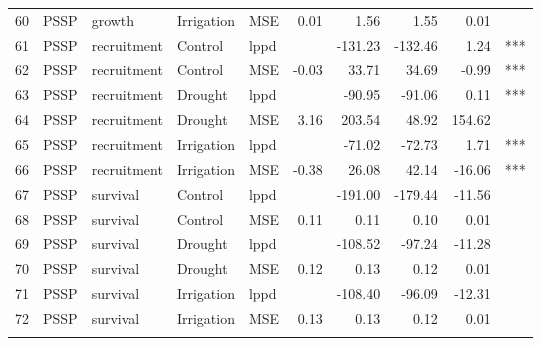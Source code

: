 \begin{longtable}{rllllrrrrl}
  60 & PSSP & growth & Irrigation & MSE & 0.01 & 1.56 & 1.55 & 0.01 &  \\ 
  61 & PSSP & recruitment & Control & lppd &  & -131.23 & -132.46 & 1.24 & *** \\ 
  62 & PSSP & recruitment & Control & MSE & -0.03 & 33.71 & 34.69 & -0.99 & *** \\ 
  63 & PSSP & recruitment & Drought & lppd &  & -90.95 & -91.06 & 0.11 & *** \\ 
  64 & PSSP & recruitment & Drought & MSE & 3.16 & 203.54 & 48.92 & 154.62 &  \\ 
  65 & PSSP & recruitment & Irrigation & lppd &  & -71.02 & -72.73 & 1.71 & *** \\ 
  66 & PSSP & recruitment & Irrigation & MSE & -0.38 & 26.08 & 42.14 & -16.06 & *** \\ 
  67 & PSSP & survival & Control & lppd &  & -191.00 & -179.44 & -11.56 &  \\ 
  68 & PSSP & survival & Control & MSE & 0.11 & 0.11 & 0.10 & 0.01 &  \\ 
  69 & PSSP & survival & Drought & lppd &  & -108.52 & -97.24 & -11.28 &  \\ 
  70 & PSSP & survival & Drought & MSE & 0.12 & 0.13 & 0.12 & 0.01 &  \\ 
  71 & PSSP & survival & Irrigation & lppd &  & -108.40 & -96.09 & -12.31 &  \\ 
  72 & PSSP & survival & Irrigation & MSE & 0.13 & 0.13 & 0.12 & 0.01 &  \\ 
  \hline
\label{table:treatmentPreds}
\end{longtable}
